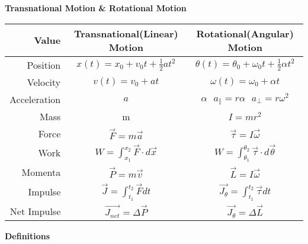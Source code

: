\documentclass[12pt,letterpaper,fleqn]{article}
\begin{document}
\begin{center}
{\LARGE\bf Transnational Motion \& Rotational Motion  }
\end{center}

\begin{table}[htb]
\begin{center}
	\begin{tabular}{|r||c|c|}\hline
	Value & Transnational(Linear) Motion & Rotational(Angular) Motion \\\hline\hline
    Position & $x(t) = x_0 + v_0t + \frac{1}{2}at^2 $ &
     $\theta(t) = \theta_0 + \omega_0t + \frac{1}{2} \alpha t^2$ \\\hline
    Velocity & $ v(t) = v_0 + at $ & 
    $\omega(t) = \omega_0 + \alpha t $\\\hline
    Acceleration & $ a $ & $\alpha \ \ \  a_{\parallel} = r\alpha \ \ \  a_{\bot} = r\omega^2 $\\\hline
    Mass & m & $ I = mr^2 $\\\hline
    Force & $\vec{F} = m\vec{a}$ & $\vec{\tau} = I\vec{\omega}$ \\\hline
    Work & $ W = \int_{x_1}^{x_2} \vec{F}\cdot d\vec{x}$ & $ W =\int_{\theta_1}^{\theta_2} \vec{\tau} \cdot d\vec{\theta}$\\\hline
    Momenta & $\vec{P} = m\vec{v} $ & $\vec{L} = I\vec{\omega} $\\\hline
    Impulse & $\vec{J} = \int_{t_1}^{t_2} \vec{F}dt $ & $ \vec{J_\theta} = \int_{t_1}^{t_2} \vec{\tau}dt$ \\\hline
    Net Impulse & $\vec{J_{net}} = \Delta \vec{P}$& $\vec{J_{\theta}} = \Delta \vec{L}$\\\hline
	\end{tabular} 
\end{center}
\end{table}

\begin{flushleft}
{\large\bf Definitions} 
\end{flushleft}






\end{document}
